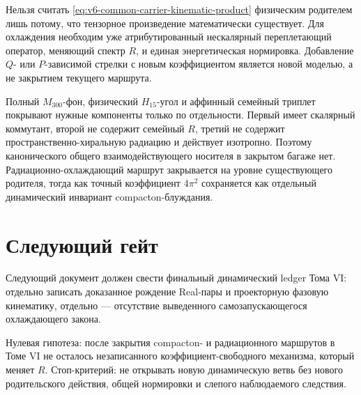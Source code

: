 \begin{nogocriterion}
Нельзя считать \eqref{eq:v6-common-carrier-kinematic-product} физическим
родителем лишь потому, что тензорное произведение математически
существует. Для охлаждения необходим уже атрибутированный нескалярный
переплетающий оператор, меняющий спектр $R$, и единая энергетическая
нормировка.
Добавление $Q$- или $P$-зависимой стрелки с новым коэффициентом является
новой моделью, а не закрытием текущего маршрута.
\end{nogocriterion}

\begin{proposition}
Полный $M_{300}$-фон, физический $H_{15}$-угол и аффинный семейный
триплет покрывают нужные компоненты только по отдельности. Первый имеет
скалярный коммутант, второй не содержит семейный $R$, третий не содержит
пространственно-хиральную радиацию и действует изотропно. Поэтому
канонического общего взаимодействующего носителя в закрытом багаже нет.
Радиационно-охлаждающий маршрут закрывается на уровне существующего
родителя, тогда как точный коэффициент $4\pi^2$ сохраняется как отдельный
динамический инвариант compacton-блуждания.
\end{proposition}

\section{Следующий гейт}

Следующий документ
должен свести финальный динамический ledger Тома VI: отдельно записать
доказанное рождение Real-пары и проекторную фазовую кинематику, отдельно
--- отсутствие выведенного самозапускающегося охлаждающего закона.

Нулевая гипотеза: после закрытия compacton- и радиационного маршрутов в
Томе VI не осталось незаписанного коэффициент-свободного механизма,
который меняет $R$. Стоп-критерий: не открывать новую динамическую ветвь
без нового родительского действия, общей нормировки и слепого наблюдаемого
следствия.

